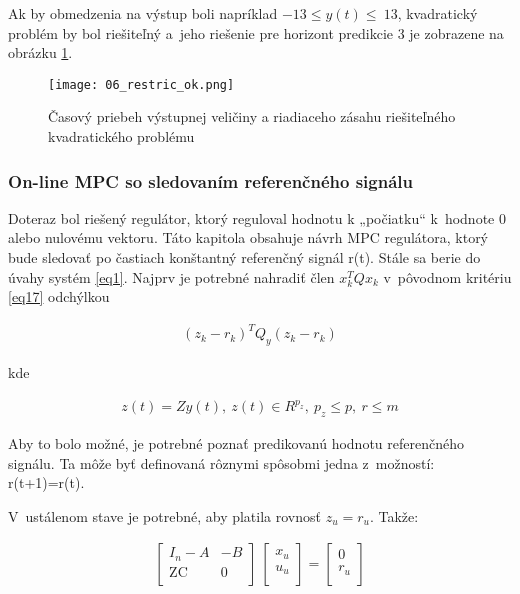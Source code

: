 Ak by obmedzenia na výstup boli napríklad
\(- 13 \leq y\left( t \right) \leq \ 13\), kvadratický problém by bol
riešiteľný a~jeho riešenie pre horizont predikcie 3 je zobrazene na
obrázku \ref{06_restric_ok}.

\begin{figure}[h]
\centering
\texttt{[image: 06\_restric\_ok.png]}
\caption{Časový priebeh výstupnej veličiny a riadiaceho zásahu riešiteľného kvadratického problému}
\label{06_restric_ok}
\end{figure}

\subsubsection{On-line MPC so sledovaním referenčného signálu}
Doteraz bol riešený regulátor, ktorý reguloval hodnotu k „počiatku``
k~hodnote 0 alebo nulovému vektoru. Táto kapitola obsahuje návrh MPC
regulátora, ktorý bude sledovať po častiach konštantný referenčný signál
r(t). Stále sa berie do úvahy systém \ref{eq1}. Najprv je potrebné nahradiť
člen \(x_{k}^{T}Qx_{k}\) v~pôvodnom kritériu \ref{eq17} odchýlkou

\begin{equation} \label{eq24}
\begin{split}
{(z_{k} - r_{k})}^{T}Q_{y}(z_{k} - r_{k})
\end{split}
\end{equation}

kde

\begin{equation} \label{eq25}
\begin{split}
z\left( t \right) = Zy\left( t \right),\ z\left( t \right) \in R^{p_{z}},\ p_{z} \leq p,\ r \leq m
\end{split}
\end{equation}

Aby to bolo možné, je potrebné poznať predikovanú hodnotu referenčného
signálu. Ta môže byť definovaná rôznymi spôsobmi jedna z~možností:
r(t+1)=r(t).

V~ustálenom stave je potrebné, aby platila rovnosť \(z_{u} = r_{u}\).
Takže:

\begin{equation} \label{eq26}
\begin{split}
\begin{bmatrix}
I_{n} - A & - B \\
\text{ZC} & 0 \\
\end{bmatrix}\ \begin{bmatrix}
x_{u} \\
u_{u} \\
\end{bmatrix} = \begin{bmatrix}
0 \\
r_{u} \\
\end{bmatrix}
\end{split}
\end{equation}


